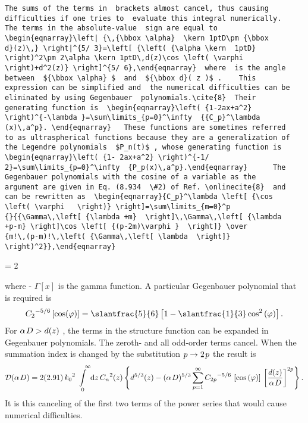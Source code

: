 \begin{verbatim}
The sums of the terms in  brackets almost cancel, thus causing
difficulties if one tries to  evaluate this integral numerically.
The terms in the absolute-value  sign are equal to
\begin{eqnarray}\left| {\,{\bbox \alpha}  \kern 1ptD\pm {\bbox
d}(z)\,} \right|^{5/ 3}=\left[ {\left( {\alpha \kern  1ptD}
\right)^2\pm 2\alpha \kern 1ptD\,d(z)\cos \left( \varphi
\right)+d^2(z)} \right]^{5/ 6},\end{eqnarray}  where  is the angle
between  ${\bbox \alpha} $  and  ${\bbox d}( z )$ .    This
expression can be simplified and  the numerical difficulties can be
eliminated by using Gegenbauer  polynomials.\cite{8}  Their
generating function is  \begin{eqnarray}\left( {1-2ax+a^2}
\right)^{-\lambda }=\sum\limits_{p=0}^\infty  {{C_p}^\lambda
(x)\,a^p}. \end{eqnarray}   These functions are sometimes referred
to as ultraspherical functions because they are a generalization of
the Legendre polynomials  $P_n(t)$ , whose generating function is
\begin{eqnarray}\left( {1- 2ax+a^2} \right)^{-1/
2}=\sum\limits_{p=0}^\infty  {P_p(x)\,a^p}.\end{eqnarray}      The
Gegenbauer polynomials with the cosine of a variable as the
argument are given in Eq. (8.934  \#2) of Ref. \onlinecite{8}  and
can be rewritten as  \begin{eqnarray}{C_p}^\lambda \left[ {\cos
\left( \varphi   \right)} \right]=\sum\limits_{m=0}^p
{}{{\Gamma\,\left[ {\lambda +m}  \right]\,\Gamma\,\left[ {\lambda
+p-m} \right]\cos \left[ {(p-2m)\varphi }  \right]} \over
{m!\,(p-m)!\,\left( {\Gamma\,\left[ \lambda  \right]}
\right)^2}},\end{eqnarray}
\end{verbatim}
\newpage
\baselineskip = 2\baselineskip  %

where - $\Gamma\left[ x \right]$  is
the gamma function.  A particular Gegenbauer  polynomial that is
required is  \begin{eqnarray}{C_2}^{-5/ 6}\left[ {\cos (\varphi )}
\right]={\textstyle{\slantfrac{5}{6}}}\left[ {1- {\textstyle{
\slantfrac{1}{3}}}\cos ^2\left( \varphi  \right)} \right].
\end{eqnarray}   For  $\alpha \kern 1ptD>d(z)$ , the terms in the
structure function can  be expanded in Gegenbauer polynomials.  The
zeroth- and all odd-order  terms cancel.  When the summation index
is changed by the substitution  $p\to 2\kern 1ptp$  the result is
\begin{eqnarray} {\cal D}(\alpha \kern
1ptD)=2(2.91)\,{k_0}^2\int\limits_{\,\,\, 0}^{\,\,\,\,\,\,\infty}{\rm
d}z\,{C_n}^2(z) \left\{ {d^{5/  3}(z)- (\alpha \kern 1ptD)^{5/
3}\sum\limits_{p=1}^\infty  {{C_{2p}}^{- 5/ 6}\,\left[ {\cos \left(
\varphi  \right)} \right]}\,\left[ {{{d(z)}  \over {\alpha \kern
1ptD}}} \right]^{2p}} \right\}.\end{eqnarray} It is this  canceling
of the first two terms of the power series that would cause
numerical difficulties.

